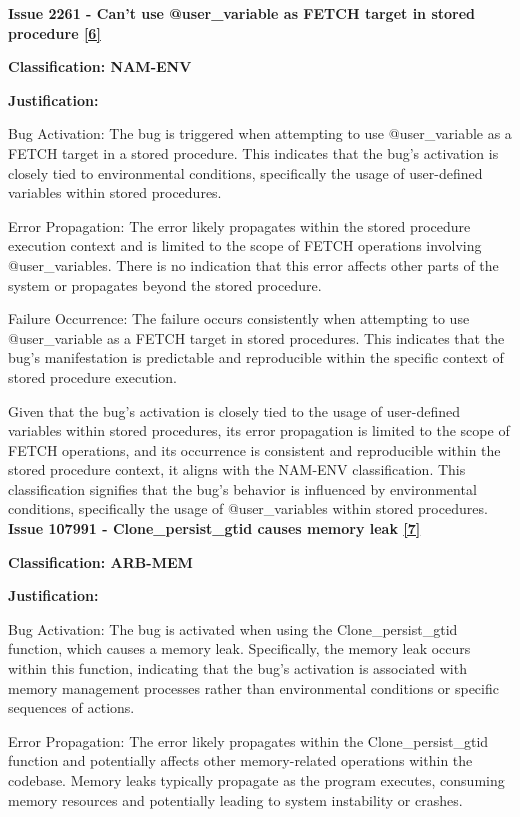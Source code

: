 \documentclass[12pt]{article}
\numberwithin{table}{section}
\begin{document}
	\textbf{Issue 2261 - Can't use @user\_variable as FETCH target in stored procedure \href{https://bugs.mysql.com/bug.php?id=2261}{[6]}}
	
	\textbf{Classification: NAM-ENV}
	
	\textbf{Justification:}
	
	Bug Activation: The bug is triggered when attempting to use @user\_variable as a FETCH target in a stored procedure. This indicates that the bug's activation is closely tied to environmental conditions, specifically the usage of user-defined variables within stored procedures.
	
	Error Propagation: The error likely propagates within the stored procedure execution context and is limited to the scope of FETCH operations involving @user\_variables. There is no indication that this error affects other parts of the system or propagates beyond the stored procedure.
	
	Failure Occurrence: The failure occurs consistently when attempting to use @user\_variable as a FETCH target in stored procedures. This indicates that the bug's manifestation is predictable and reproducible within the specific context of stored procedure execution.
	
	Given that the bug's activation is closely tied to the usage of user-defined variables within stored procedures, its error propagation is limited to the scope of FETCH operations, and its occurrence is consistent and reproducible within the stored procedure context, it aligns with the NAM-ENV classification. This classification signifies that the bug's behavior is influenced by environmental conditions, specifically the usage of @user\_variables within stored procedures.\\
	
	\textbf{
		Issue 107991 - Clone\_persist\_gtid causes memory leak \href{https://bugs.mysql.com/bug.php?id=107991}{[7]}}
	
	\textbf{Classification: ARB-MEM}
	
	\textbf{Justification:}
	
	Bug Activation: The bug is activated when using the Clone\_persist\_gtid function, which causes a memory leak. Specifically, the memory leak occurs within this function, indicating that the bug's activation is associated with memory management processes rather than environmental conditions or specific sequences of actions.
	
	Error Propagation: The error likely propagates within the Clone\_persist\_gtid function and potentially affects other memory-related operations within the codebase. Memory leaks typically propagate as the program executes, consuming memory resources and potentially leading to system instability or crashes.
	
\end{document}
